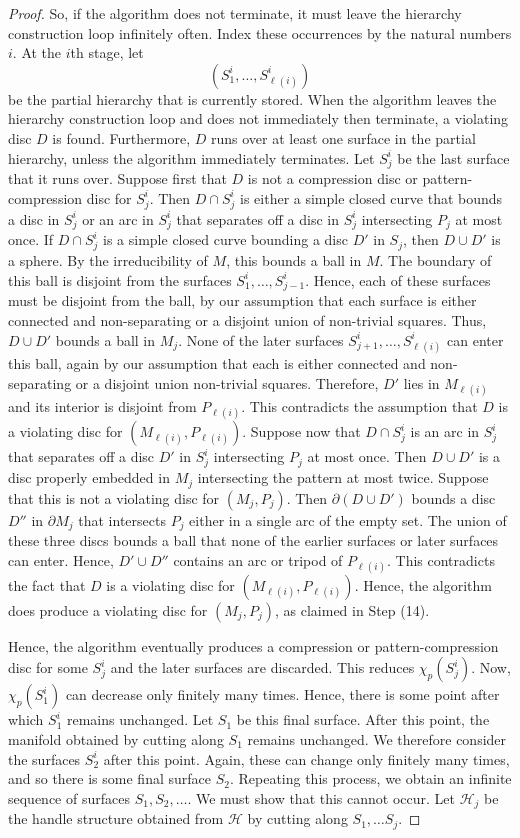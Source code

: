 \documentclass[oneside]{amsart}
\numberwithin{equation}{section}
\theoremstyle{plain}
\theoremstyle{definition}
\newcommand{\calH}{\mathcal{H}}
\begin{document}
\begin{proof}
So, if the algorithm does not terminate, it must leave the hierarchy construction loop infinitely often. Index these occurrences by the natural numbers $i$. At the $i$th stage, let
$$(S_1^i, \dots, S_{\ell(i)}^i)$$ 
be the partial hierarchy that is currently stored. When the algorithm leaves the hierarchy construction loop and does not immediately then terminate, a violating disc $D$ is found. Furthermore, $D$ runs over at least one surface in the partial hierarchy, unless the algorithm immediately terminates. Let $S_j^i$ be the last surface that it runs over. Suppose first that $D$ is not a compression disc or pattern-compression disc for $S_j^i$. Then $D \cap S_j^i$ is either a simple closed curve that bounds a disc in $S_j^i$ or an arc in $S_j^i$ that separates off a disc in $S_j^i$ intersecting $P_j$ at most once. If $D \cap S_j^i$ is a simple closed curve bounding a disc $D'$ in $S_j$, then $D \cup D'$ is a sphere. By the irreducibility of $M$, this bounds a ball in $M$. The boundary of this ball is disjoint from the surfaces $S_1^i, \dots, S_{j-1}^i$. Hence, each of these surfaces must be disjoint from the ball, by our assumption that each surface is either connected and non-separating or a disjoint union of non-trivial squares. Thus, $D \cup D'$ bounds a ball in $M_j$. None of the later surfaces $S_{j+1}^i, \dots, S_{\ell(i)}^i$ can enter this ball, again by our assumption that each is either connected and non-separating or a disjoint union non-trivial squares. Therefore, $D'$ lies in $M_{\ell(i)}$ and its interior is disjoint from $P_{\ell(i)}$. This contradicts the assumption that $D$ is a violating disc for $(M_{\ell(i)}, P_{\ell(i)})$. Suppose now that $D \cap S_j^i$ is an arc in $S_j^i$ that separates off a disc $D'$ in $S_j^i$ intersecting $P_j$ at most once. Then $D \cup D'$ is a disc properly embedded in $M_j$ intersecting the pattern at most twice. Suppose that this is not a violating disc for $(M_{j}, P_{j})$. Then $\partial (D \cup D')$ bounds a disc $D''$ in $\partial M_{j}$ that intersects $P_j$ either in a single arc of the empty set. The union of these three discs bounds a ball that none of the earlier surfaces or later surfaces can enter. Hence, $D' \cup D''$ contains an arc or tripod of $P_{\ell(i)}$. This contradicts the fact that $D$ is a violating disc for $(M_{\ell(i)}, P_{\ell(i)})$. Hence, the algorithm does produce a violating disc for $(M_j, P_j)$, as claimed in Step (14). 

Hence, the algorithm eventually produces a compression or pattern-compression disc for some $S_j^i$ and the later surfaces are discarded. This reduces $\chi_p(S_j^i)$. 
Now, $\chi_p(S_1^i)$ can decrease only finitely many times. Hence, there is some point after which $S_1^i$ remains unchanged. Let $S_1$ be this final surface. After this point, the manifold obtained by cutting along $S_1$ remains unchanged. We therefore consider the surfaces $S_2^i$ after this point. Again, these can change only finitely many times, and so there is some final surface $S_2$. Repeating this process, we obtain an infinite sequence of surfaces $S_1, S_2, \dots$. We must show that this cannot occur. Let $\calH_j$ be the handle structure obtained from $\calH$ by cutting along $S_1, \dots S_j$.


\end{proof}
\end{document}
